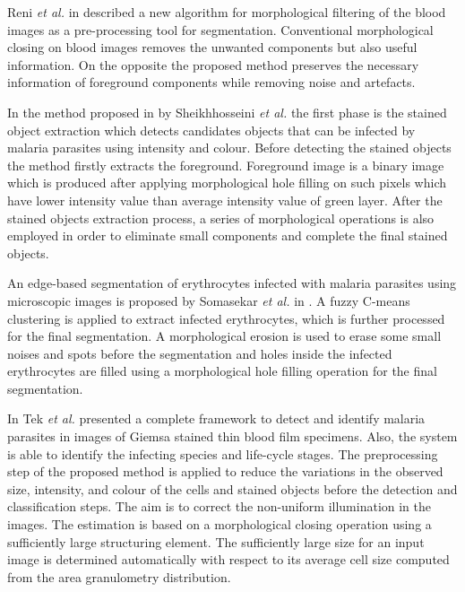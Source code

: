 \documentclass[sensors,review,submit,moreauthors,pdftex,10pt,a4paper]{mdpi}
\begin{document}
Reni \emph{et al.} in \cite{Reni2015} described a new algorithm for morphological filtering of the blood images as a pre-processing tool for segmentation. Conventional morphological closing on blood images removes the unwanted components but also useful information. On the opposite the proposed method preserves the necessary information of foreground components while removing noise and artefacts.

In the method proposed in \cite{Sheik2013} by Sheikhhosseini \emph{et al.} the first phase is the stained object extraction which detects candidates objects that can be infected by malaria parasites using intensity and colour. Before detecting the stained objects the method firstly extracts the foreground. Foreground image is a binary image which is produced after applying morphological hole filling on such pixels which have lower intensity value than average intensity value of green layer. After the stained objects extraction process, a series of morphological operations is also employed in order to eliminate small components and complete the final stained objects.

An edge-based segmentation of erythrocytes infected with malaria parasites using microscopic images is proposed by Somasekar \emph{et al.} in \cite{Somasekar2015}.  A fuzzy C-means clustering is applied to extract infected erythrocytes, which is further processed for the final segmentation. A morphological erosion is used to erase some small noises and spots before the segmentation and holes inside the infected erythrocytes are filled using a morphological hole filling operation for the final segmentation.

In \cite{Tek2010} Tek \emph{et al.} presented a complete framework to detect and identify malaria parasites in images of Giemsa stained thin blood film specimens. Also, the system is able to identify the infecting species and life-cycle stages.
The preprocessing step of the proposed method is applied to reduce the variations in the observed size, intensity, and colour of the cells and stained objects before the detection and classification steps. The aim is to correct the non-uniform illumination in the images. The estimation is based on a morphological closing operation using a sufficiently large structuring element. The sufficiently large size for an input image is determined automatically with respect to its average cell size computed from the area granulometry distribution.
\end{document}
